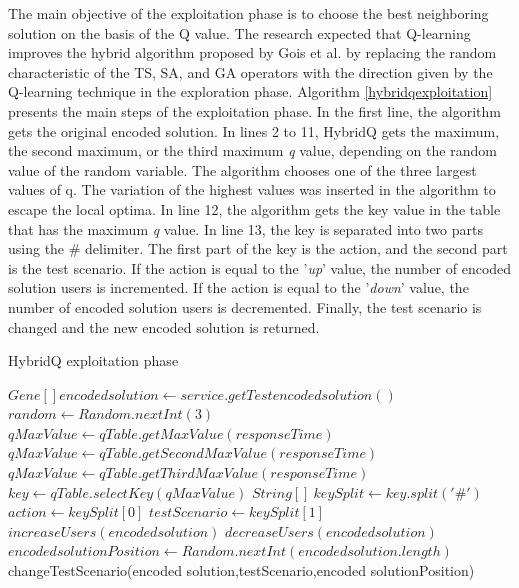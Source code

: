 \documentclass{bmcart}
\begin{document}
The main objective of the exploitation phase is to choose the best neighboring solution on the basis of the Q value. The research expected that Q-learning improves the hybrid algorithm proposed by Gois et al. by replacing the random characteristic of the TS, SA, and GA operators with the direction given by the Q-learning technique in the exploration phase. Algorithm \ref{hybridqexploitation} presents the main steps of the exploitation phase. In the first line, the algorithm gets the original encoded solution. In lines 2 to 11, HybridQ gets the maximum, the second maximum, or the third maximum \textit{q} value, depending on the random value of the random variable. The algorithm chooses one of the three largest values of q. The variation of the highest values was inserted in the algorithm to escape the local optima. In line 12, the algorithm gets the key value in the table that has the maximum \textit{q} value. In line 13, the key is separated into two parts using the \# delimiter. The first part of the key is the action, and the second part is the test scenario. If the action is equal to the '\textit{up}' value, the number of encoded solution users is incremented. If the action is equal to the '\textit{down}' value, the number of encoded solution users is decremented. Finally, the test scenario is changed and the new encoded solution is returned.




\begin{algorithm}[h]
  \caption{HybridQ exploitation phase }\label{hybridqexploitation}
  \begin{algorithmic}[1]    
    \State $Gene[] encoded solution \gets service.getTestencoded solution()$
    \State $random \gets Random.nextInt(3)$
    \State $qMaxValue \gets qTable.getMaxValue(responseTime)$
    \EndIf
    \State $qMaxValue \gets qTable.getSecondMaxValue(responseTime)$
    \EndIf
    \State $qMaxValue \gets qTable.getThirdMaxValue(responseTime)$
    \EndIf
    \State $key \gets qTable.selectKey(qMaxValue)$
    \State $String[]\  keySplit \gets key.split('\#')$ 
    \State $action \gets keySplit[0]$
    \State $testScenario \gets keySplit[1]$   
    \State $ increaseUsers(encoded solution) $
    \EndIf
    \State $ decreaseUsers(encoded solution) $
    \EndIf    
    \State $encoded solutionPosition \gets Random.nextInt(encoded solution.length)$
    \State changeTestScenario(encoded solution,testScenario,encoded solutionPosition)
  \end{algorithmic}
\end{algorithm}
\end{document}
